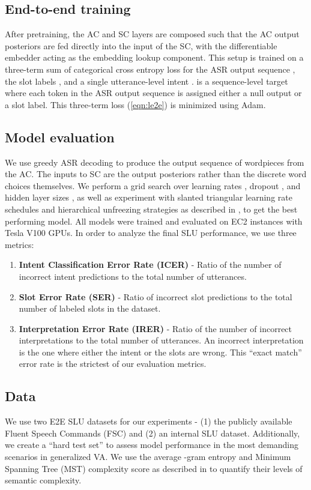 \subsection{End-to-end training}
After pretraining, the AC and SC layers are composed such that the AC output posteriors are fed directly into the input of the SC, with the differentiable embedder acting as the embedding lookup component. This setup is trained on a three-term sum of categorical cross entropy loss for the ASR output sequence , the slot labels , and a single utterance-level intent .   is a sequence-level target where each token in the ASR output sequence is assigned either a null output or a slot label. This three-term loss (\cref{eqn:le2e}) is minimized using Adam. 





\subsection{Model evaluation}
We use greedy ASR decoding to produce the output sequence of wordpieces from the AC. The inputs to SC are the output posteriors rather than the discrete word choices themselves. We perform a grid search over learning rates , dropout , and hidden layer sizes , as well as experiment with slanted triangular learning rate schedules and hierarchical unfreezing strategies as described in \cite{howard2018universal}, to get the best performing model. All models were trained and evaluated on EC2 instances with Tesla V100 GPUs.  In order to analyze the final SLU performance, we use three metrics:
\begin{enumerate}
	\item \textbf{Intent Classification Error Rate (ICER) }- Ratio of the number of incorrect intent predictions to the total number of utterances.
	\item \textbf{Slot Error Rate (SER)} - Ratio of incorrect slot predictions to the total number of labeled slots in the dataset.
	\item \textbf{Interpretation Error Rate (IRER)} -  Ratio of the number of incorrect interpretations to the total number of utterances. An incorrect interpretation is the one where either the intent or the slots are wrong. This ``exact match'' error rate is the strictest of our evaluation metrics.
\end{enumerate}


\subsection{Data}
We use two E2E SLU datasets for our experiments - (1) the publicly available Fluent Speech Commands (FSC) and (2) an internal SLU dataset. Additionally, we create a ``hard test set'' to assess model performance in the most demanding scenarios in generalized VA. We use the average -gram entropy and Minimum Spanning Tree (MST) complexity score as described in \cite{mckenna2020semantic} to quantify their levels of semantic complexity.

